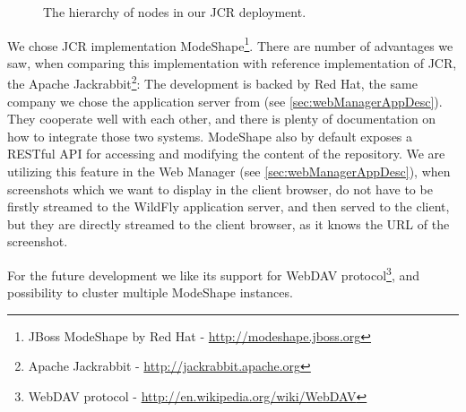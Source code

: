 \documentclass[11pt,oneside,final]{fithesis2}
\begin{document}
    \begin{figure}[!htb]
      \begin{center}
      \leavevmode
      \centerline{}
      \end{center}
      \caption{The hierarchy of nodes in our JCR deployment.}
      \label{fig:ourJCRHierarchy}
    \end{figure}
    
    \label{sec:whyWeChooseJCR}
    We chose JCR implementation ModeShape\footnote{JBoss ModeShape by Red Hat - \url{http://modeshape.jboss.org}}. There are number
    of advantages we saw, when comparing this implementation with reference implementation of JCR, the Apache 
    Jackrabbit\footnote{Apache Jackrabbit - \url{http://jackrabbit.apache.org}}: The development is backed by Red Hat, the same 
    company we chose the application server from (see \ref{sec:webManagerAppDesc}). 
    They cooperate well with each other, and there is plenty of documentation on how to integrate those two systems.
    ModeShape also by default exposes a RESTful API for accessing and modifying the content of the repository. We are utilizing 
    this feature in the Web Manager (see \ref{sec:webManagerAppDesc}), when screenshots which we want to display in the client browser,
    do not have to be firstly streamed to the WildFly application server, and then served to the client, but they are directly
    streamed to the client browser, as it knows the URL of the screenshot.
    
    For the future development we like its support for 
    WebDAV protocol\footnote{WebDAV protocol - \url{http://en.wikipedia.org/wiki/WebDAV}}, and possibility to cluster multiple
    ModeShape instances.
    
\end{document}
